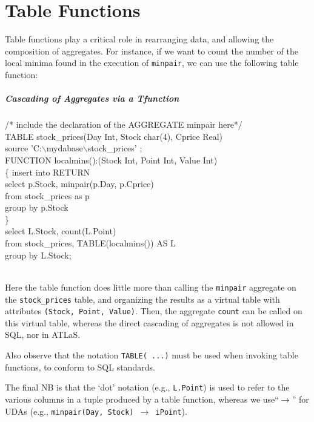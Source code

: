 
\chapter{Table Functions}
Table functions play a critical role in rearranging data, and
allowing the composition of aggregates. For instance,
if we want to count the number
of the local minima found in the execution of {\tt minpair},
we can use the following table function:


\paragraph{Cascading of Aggregates via a Tfunction}
\begin{codedisplay}
\> /* include the declaration of the {AGGREGATE} minpair here*/\\
\> TABLE stock\_prices(Day Int, Stock char(4), Cprice Real)\\
\>\>\>\>\>\>\>\>\>\>\>source  'C:$\backslash$mydabase$\backslash$stock\_prices' ;\\

\>FUNCTION localmins():(Stock Int, Point Int, Value Int)\\
\>\> \{ \> insert into RETURN\\
\>\>\>select p.Stock, minpair(p.Day, p.Cprice)\\
\>\>\>\>from stock\_prices as p\\
\>\>\>\> group by p.Stock\\
\> \>\> \} \\[0.2cm]
\>select  L.Stock,  count(L.Point)\\
\>\>from  stock\_prices, TABLE(localmins()) AS L\\
\>\>group by L.Stock; \\
\>\\
\end{codedisplay}

Here the table function does little more than calling the {\tt minpair}
aggregate on the {\tt stock\_prices} table, and organizing the results
as a virtual table with attributes  {\tt (Stock, Point, Value)}. Then,
the aggregate {\tt count} can be called on this virtual table,
whereas the direct cascading of aggregates is not allowed in
SQL, nor in ATLaS.

Also observe that the notation
{\tt TABLE( ...)} must be used when invoking table functions,
to conform to SQL standards.

The final NB is that the `dot' notation
(e.g., {\tt L.Point})  is used to refer to the various columns in a
tuple produced by a table function, whereas we use``$\rightarrow$''
for UDAs (e.g., {\tt minpair(Day, Stock) $\rightarrow$ iPoint}).

